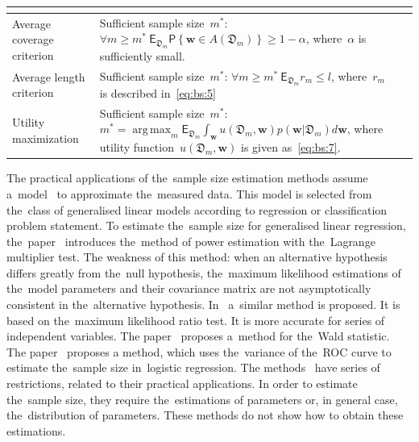\documentclass[
11pt,%
tightenlines,%
twoside,%
onecolumn,%
nofloats,%
nobibnotes,%
nofootinbib,%
superscriptaddress,%
noshowpacs,%
centertags]%
{revtex4}
\DeclareMathOperator*{\argmax}{arg\,max}
\begin{document}
\begin{table}
\begin{tabular}{p{}|p{}|p{}}
	&\cite{joseph1995, joseph1997}\\
\hline
	Average coverage criterion &
	Sufficient sample size~$m^*$:	 $\forall m \geq m^* ~ \mathsf{E}_{\mathfrak{D}_m}\mathsf{P}\left\{\mathbf{w} \in A\left(\mathfrak{D}_m\right)\right\} \geq 1-\alpha$, where~$\alpha$ is sufficiently small.
	&\cite{joseph1995, joseph1997}\\
\hline
	Average length criterion &
	Sufficient sample size~$m^*$:	 $\forall m \geq m^* ~ \mathsf{E}_{\mathfrak{D}_m}r_m\leq l$,  where~$r_m$ is described in~\eqref{eq:bs:5}
	&\cite{joseph1995, joseph1997}\\
\hline
	Utility maximization &
	Sufficient sample size~$m^*$: $m^* = \argmax_{m} \mathsf{E}_{\mathfrak{D}_m}\int_{\mathbf{w}}u\left(\mathfrak{D}_m, \mathbf{w}\right)p(\mathbf{w}|\mathfrak{D}_m)d\mathbf{w}$, where utility function~$u\left(\mathfrak{D}_m, \mathbf{w}\right)$ is given as~\eqref{eq:bs:7}.
	&\cite{lindley1997}\\
\hline
\end{tabular}
\end{table}

The practical applications of the~sample size estimation methods assume a~model~\cite{kloek1975} to approximate the~measured data. This model is selected from the~class of generalised linear models according to regression or classification problem statement. To estimate the~sample size for generalised linear regression, the~paper~\cite{self1988} introduces the~method of power estimation with the~Lagrange multiplier test. The weakness of this method: when an alternative hypothesis differs greatly from the~null hypothesis, the~maximum likelihood estimations of the~model parameters and their covariance matrix are not asymptotically consistent in the~alternative hypothesis. In~\cite{self1992} a~similar method is proposed. It is based on the~maximum likelihood ratio test. It is more accurate for series of independent variables. The paper~\cite{shieh2005} proposes a~method for the~Wald statistic. The paper~\cite{motrenko2014} proposes a method, which uses the~variance of the~ROC curve to estimate the~sample size in~logistic regression. The methods~\cite{self1988, self1992, shieh2000, shieh2005} have series of restrictions, related to their practical applications. In order to estimate the~sample size, they require the~estimations of parameters or, in general case, the~distribution of parameters. These methods do not show how to obtain these estimations. %
\end{document}
